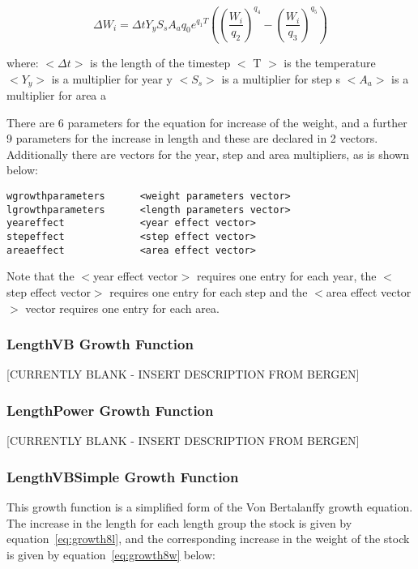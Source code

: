 \documentclass [a4paper, 10pt]{book}
\begin{document}
\begin{equation}\label{eq:growth5w}
\Delta W_{i} = \Delta t Y_{y} S_{s} A_{a} q_{0} e^{q_{1}T}\left(
\left( \frac{W_{i}}{q_{2}} \right)^{q_{4}} -
\left( \frac{W_{i}}{q_{3}} \right)^{q_{5}} \right)
\end{equation}

where:\newline
$<\Delta t>$ is the length of the timestep\newline
$<$ T $>$ is the temperature\newline
$<Y_{y}>$ is a multiplier for year y\newline
$<S_{s}>$ is a multiplier for step s\newline
$<A_{a}>$ is a multiplier for area a

\bigskip
There are 6 parameters for the equation for increase of the weight, and a further 9 parameters for the increase in length and these are declared in 2 vectors.  Additionally there are vectors for the year, step and area multipliers, as is shown below:

{\small\begin{verbatim}
wgrowthparameters      <weight parameters vector>
lgrowthparameters      <length parameters vector>
yeareffect             <year effect vector>
stepeffect             <step effect vector>
areaeffect             <area effect vector>
\end{verbatim}}

Note that the $<$year effect vector$>$ requires one entry for each year, the $<$step effect vector$>$ requires one entry for each step and the $<$area effect vector$>$ vector requires one entry for each area.

\subsubsection{LengthVB Growth Function}\label{subsec:growth6}
[CURRENTLY BLANK - INSERT DESCRIPTION FROM BERGEN]

\subsubsection{LengthPower Growth Function}\label{subsec:growth7}
[CURRENTLY BLANK - INSERT DESCRIPTION FROM BERGEN]

\subsubsection{LengthVBSimple Growth Function}\label{subsec:growth8}
This growth function is a simplified form of the Von Bertalanffy growth equation.  The increase in the length for each length group the stock is given by equation~\ref{eq:growth8l}, and the corresponding increase in the weight of the stock is given by equation~\ref{eq:growth8w} below:
\end{document}
